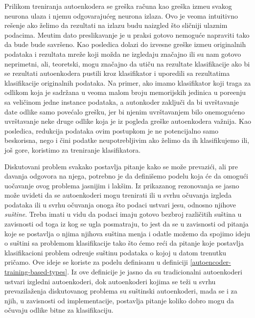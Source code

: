 \documentclass{article}
\begin{document}
	Prilikom treniranja autoenkodera se gre\v ska ra\v cuna kao gre\v ska izme\dj u svakog neurona ulaza i njemu odgovaraju\'ceg neurona izlaza. 
	Ovo je veoma intuitivno re\v senje ako \v zelimo da rezultati na izlazu budu naizgled \v sto sli\v cniji ulaznim podacima. 
	Me\dj utim dato preslikavanje je u praksi gotovo nemogu\'ce napraviti tako da bude bude savr\v seno.
	Kao posledica dolazi do izvesne gre\v ske izme\dj u originalnih podataka i rezultata mre\v ze koji mo\v zda ne izgledaju zna\v cajno ili su nam gotovo neprimetni, ali, teoretski, mogu zna\v cajno da uti\v cu na rezultate klasifikacije ako bi se rezultati autoenkodera pustili kroz klasifikator i uporedili sa rezultatima klasifikacije originalnih podataka.
	Na primer, ako imamo klasifikator koji traga za odlikom koja je sadr\v zana u veoma malom broju memorijskih jedinica u pore\dj enju sa veli\v cinom jedne instance podataka, a autonkoder zaklju\v ci da bi uvr\v stavanje date odlike samo pove\'calo gre\v sku, jer bi njenim uvr\v stavanjem bilo onemogu\'ceno uvr\v stavanje neke druge odlike koja je iz pogleda gre\v ske autoenkodera va\v znija.
	Kao posledica, redukcija podataka ovim postupkom je ne potencijalno samo beskorisna, nego i \v cini podatke neupotrebljivim ako \v zelimo da ih klasifikujemo ili, jo\v s gore, koristimo za treniranje klasifikatora.
	
	Diskutovani problem svakako postavlja pitanje kako se mo\v ze prevazi\'ci, ali pre davanja odgovora na njega, potrebno je da defini\v semo podelu koja \'ce da omogu\'ci uo\v cavanje ovog problema jasnijim i lak\v sim. 
	Iz prikazanog rezonovanja se jasno mo\v ze uvideti da se autoenkoderi mogu trenirati ili u svrhu o\v cuvanja izgleda podataka ili u svrhu o\v cuvanja onoga \v sto podaci ustvari jesu, odnosno njihove \emph{su\v stine}.
	Treba imati u vidu da podaci imaju gotovo bezbroj razli\v citih su\v stina u zavisnosti od toga iz kog se ugla posmatraju, to jest da se u zavisnosti od pitanja koje se postavlja o njima njihova su\v stina menja i odatle mo\v zemo da spojimo ideju o su\v stini sa problemom klasifikacije tako \v sto \'cemo re\'ci da pitanje koje postavlja klasifikacioni problem odre\dj uje su\v stinu podataka o kojoj u datom trenutku pri\v camo.
	Ove ideje se koriste za podelu definisanu u definiciji \ref{autoencoder-training-based-types}. Iz ove definicije je jasno da su tradicionalni autoenkoderi ustvari izgledni autoenkoderi, dok autoenkoderi kojima se te\v zi u svrhu prevazila\v zenja diskutovanog problema su su\v stinski autoenkoderi, mada se i za njih, u zavisnosti od implementacije, postavlja pitanje koliko dobro mogu da o\v cuvaju odlike bitne za klasifikaciju.
	
\end{document}
